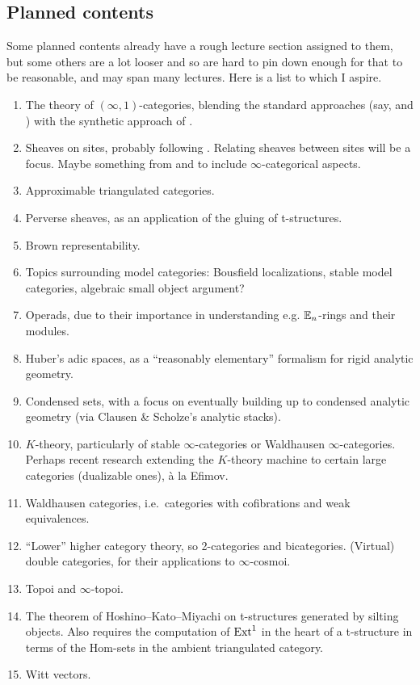 \documentclass[a4paper, 11pt]{article}
\newcommand{\1}{\ensuremath{\mathbb{1}}}
\newcommand{\2}{\ensuremath{\mathbb{2}}}
\newcommand{\3}{\ensuremath{\mathbb{3}}}
\begin{document}
\subsection{Planned contents}
Some planned contents already have a rough lecture section assigned to them, but some others are a lot looser and so are hard to pin down enough for that to be reasonable, and may span many lectures.
Here is a list to which I aspire.
\begin{enumerate}[label=(\arabic*)]
\item The theory of \((\infty,1)\)-categories, blending the standard approaches (say, \cite{lurie-htt} and \cite{cisinski-book}) with the synthetic approach of \cite{riehl-verity-elements}.
\item Sheaves on sites, probably following \cite{kashiwara-schapira-book}. Relating sheaves between sites will be a focus. Maybe something from \cite[§6.2.2]{lurie-htt} and \cite[§1.3.1]{lurie-sag}
to include \(\infty\)-categorical aspects.
\item Approximable triangulated categories.
\item Perverse sheaves, as an application of the gluing of t-structures.
\item Brown representability.
\item Topics surrounding model categories: Bousfield localizations, stable model categories, algebraic small object argument?
\item Operads, due to their importance in understanding e.g. \(\mathbb{E}_n\)-rings and their modules.
\item Huber's adic spaces, as a ``reasonably elementary'' formalism for rigid analytic geometry.
\item Condensed sets, with a focus on eventually building up to condensed analytic geometry (via Clausen \& Scholze's analytic stacks).
\item \(K\)-theory, particularly of stable \(\infty\)-categories or Waldhausen \(\infty\)-categories. Perhaps recent research extending the \(K\)-theory machine to certain large categories (dualizable ones), à la Efimov.
\item Waldhausen categories, i.e.\ categories with cofibrations and weak equivalences.
\item ``Lower'' higher category theory, so 2-categories and bicategories. (Virtual) double categories, for their applications to \(\infty\)-cosmoi.
\item Topoi and \(\infty\)-topoi.
\item The theorem of Hoshino--Kato--Miyachi on t-structures generated by silting objects. Also requires the computation of \(\operatorname{Ext}^1\) in the heart of a t-structure
in terms of the Hom-sets in the ambient triangulated category.
\item Witt vectors.
\end{enumerate}
\end{document}
